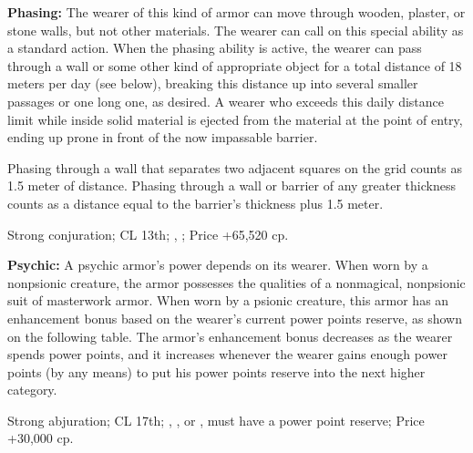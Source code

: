 

\textbf{Phasing:} The wearer of this kind of armor can move through wooden, plaster, or stone walls, but not other materials. The wearer can call on this special ability as a standard action. When the phasing ability is active, the wearer can pass through a wall or some other kind of appropriate object for a total distance of 18 meters per day (see below), breaking this distance up into several smaller passages or one long one, as desired. A wearer who exceeds this daily distance limit while inside solid material is ejected from the material at the point of entry, ending up prone in front of the now impassable barrier.

Phasing through a wall that separates two adjacent squares on the grid counts as 1.5 meter of distance. Phasing through a wall or barrier of any greater thickness counts as a distance equal to the barrier's thickness plus 1.5 meter.

Strong conjuration; CL 13th; , ; Price +65,520 cp.

\textbf{Psychic:} A psychic armor's power depends on its wearer. When worn by a nonpsionic creature, the armor possesses the qualities of a nonmagical, nonpsionic suit of masterwork armor. When worn by a psionic creature, this armor has an enhancement bonus based on the wearer's current power points reserve, as shown on the following table. The armor's enhancement bonus decreases as the wearer spends power points, and it increases whenever the wearer gains enough power points (by any means) to put his power points reserve into the next higher category.


Strong abjuration; CL 17th; , ,  or , must have a power point reserve; Price +30,000 cp.

